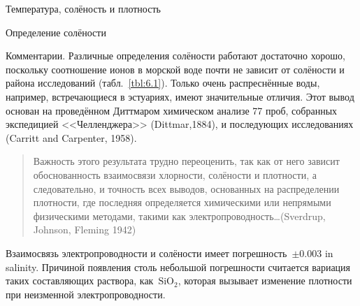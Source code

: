 \begin{chapter}{Температура, солёность и плотность}
\begin{section}{Определение солёности}
\begin{paragraph}{Комментарии.}
Различные определения солёности работают достаточно хорошо, поскольку
соотношение ионов в морской воде почти не зависит от солёности и
района исследований (табл.~\ref{tbl:6.1}). Только очень распреснённые воды, 
например, встречающиеся в эстуариях, имеют значительные отличия. Этот вывод
основан на проведённом Диттмаром химическом анализе 77 проб, собранных 
экспедицией <<Челленджера>> (Dittmar,1884), и последующих исследованиях
(Carritt and Carpenter, 1958).
\begin{quotation}
Важность этого результата трудно переоценить, так как от него зависит
обоснованность взаимосвязи хлорности, солёности и плотности, а следовательно,
и точность всех выводов, основанных на распределении плотности,
где последняя определяется химическими или непрямыми физическими
методами, такими как электропроводность\dots (Sverdrup, Johnson, Fleming 1942)
\end{quotation}
Взаимосвязь электропроводности и солёности имеет погрешность~$\pm 0.003$
in salinity. Причиной появления столь небольшой погрешности считается
вариация таких составляющих раствора, как~$\text{SiO}_2$, которая вызывает
изменение плотности при неизменной электропроводности.
%


\end{paragraph}
\end{section}
\end{chapter}
